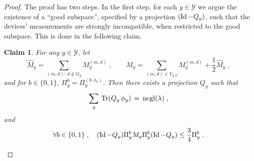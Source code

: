 \documentclass[11pt]{article}
\newtheorem{claim}[theorem]{Claim}
\theoremstyle{remark}
\theoremstyle{definition}
\newcommand{\Tr}{\mbox{\rm Tr}}
\newcommand{\Id}{\ensuremath{\mathop{\rm Id}\nolimits}}
\newcommand{\mY}{\ensuremath{\mathcal{Y}}}
\DeclareMathOperator{\negl}{negl}
\newcommand{\dset}{G}
\begin{document}
\begin{proof}
The proof has two steps. In the first step, for each $y\in\mY$ we argue the existence of a ``good subspace'', specified by a projection $(\Id-Q_y)$, such that the devices' measurements are strongly incompatible, when restricted to the good subspace. This is done in the following claim. 

\begin{claim}
For any $y\in \mY$, let 
$$\hat{M}_y = \sum_{(m,d):\, d\notin \dset_y} M_{y}^{(m,d)}\;,\qquad M_y = \sum_{(m,d) \in V_{y,0}} M_y^{(m,d)} + \frac{1}{2} \hat{M}_y\;,$$
and for $b \in\{0,1\}$, $\Pi_y^b = \Pi_y^{(b,x_b)}$.
Then there exists a projection $Q_y$ such that 
\begin{equation}\label{eq:q-negl2}
\sum_y \, \Tr(Q_y\,\phi_y)\,=\, \negl(\lambda)\;,
\end{equation} and
\begin{equation}\label{eq:q-norm-2}
\forall b\in\{0,1\}\;,\quad (\Id-Q_y)\Pi_y^b M_y \Pi_y^b (\Id-Q_y) \leq \frac{3}{4} \Pi_y^b\;.
\end{equation}
\end{claim}


\end{proof}
\end{document}

